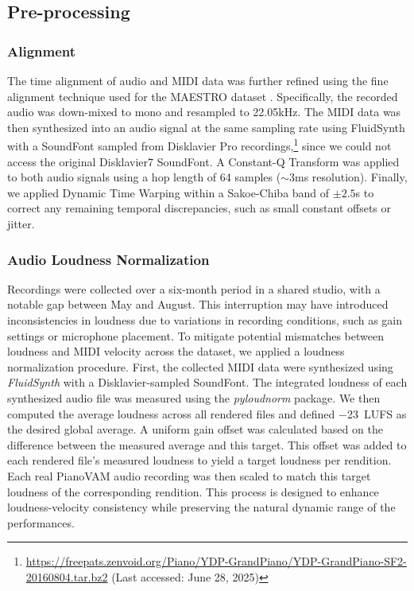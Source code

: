\documentclass{article}
\begin{document}
\subsection{Pre-processing}
\subsubsection{Alignment}\label{subsubsec:alignment}

The time alignment of audio and MIDI data was further refined using the fine alignment technique used for the MAESTRO dataset \cite{ICLR19Hawthorne}. 
Specifically, the recorded audio was down-mixed to mono and resampled to {22.05}\si{kHz}. 
The MIDI data was then synthesized into an audio signal at the same sampling rate using FluidSynth with a SoundFont sampled from Disklavier Pro recordings,\footnote{\href{https://freepats.zenvoid.org/Piano/YDP-GrandPiano/YDP-GrandPiano-SF2-20160804.tar.bz2}{https://freepats.zenvoid.org/Piano/YDP-GrandPiano/YDP-GrandPiano-SF2-20160804.tar.bz2} (Last accessed: June 28, 2025)\label{soundfont}} since we could not access the original Disklavier7 SoundFont.
A Constant-Q Transform was applied to  both audio signals using a hop length of 64 samples ($\sim$3\si{ms} resolution). Finally, we applied Dynamic Time Warping within a Sakoe-Chiba band of $\pm2.5$\si{s} to correct any remaining temporal discrepancies, such as small constant offsets or jitter.


\subsubsection{Audio Loudness Normalization} 
Recordings were collected over a six-month period in a shared studio, with a notable gap between May and August. This interruption may have introduced inconsistencies in loudness due to variations in recording conditions, such as gain settings or microphone placement. To mitigate potential mismatches between loudness and MIDI velocity across the dataset, we applied a loudness normalization procedure. First, the collected MIDI data were synthesized using \textit{FluidSynth} with a Disklavier-sampled SoundFont. The integrated loudness of each synthesized audio file was measured using the \textit{pyloudnorm} package\cite{steinmetz2021pyloudnorm}. We then computed the average loudness across all rendered files and defined $-$23~\si{LUFS} as the desired global average. A uniform gain offset was calculated based on the difference between the measured average and this target. This offset was added to each rendered file's measured loudness to yield a target loudness per rendition. Each real PianoVAM audio recording was then scaled to match this target loudness of the corresponding rendition. This process is designed to enhance loudness-velocity consistency while preserving the natural dynamic range of the performances.
\end{document}
